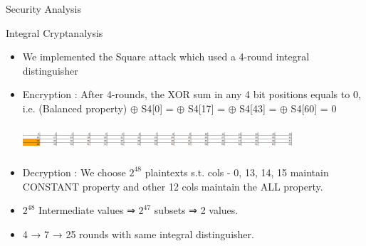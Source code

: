 \begin{frame}{Security Analysis}
\begin{block}{Integral Cryptanalysis}
\begin{itemize}
    \item We implemented the Square attack which used a 4-round integral distinguisher
    \item Encryption : After 4-rounds, the XOR sum in any 4 bit positions equals to 0, i.e. (Balanced property)
$\oplus$ S4[0] = $\oplus$ S4[17] = $\oplus$ S4[43] = $\oplus$ S4[60] = 0
    \begin{block}{}
\centering
\includegraphics[height=1cm,width=100mm]{img_5.png}
\centering
\end{block}
\item Decryption : We choose $2^{48}$ plaintexts s.t. cols - 0, 13, 14, 15 maintain CONSTANT property and other 12 cols maintain the ALL property.
\item $2^{48}$ Intermediate values ⇒ $2^{47}$ subsets ⇒ 2 values.
\item 4 → 7 → 25 rounds with same integral distinguisher.
\end{itemize}
\end{block}
\end{frame}

